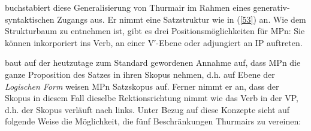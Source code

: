 \citet{Abraham1991a} buchstabiert diese Generalisierung von Thurmair im Rahmen eines generativ-syntaktischen Zugangs aus. Er nimmt eine Satzstruktur wie in (\ref{53}) an. Wie dem Strukturbaum zu entnehmen ist, gibt es drei Positionsmöglichkeiten für MPn: Sie können inkorporiert ins Verb, an einer V′-Ebene oder adjungiert an IP auftreten.

\begin{exe}
	\ex\label{53}   
\end{exe}
\citet{Abraham1991a} baut auf der heutzutage zum Standard gewordenen Annahme auf, dass MPn die ganze Proposition des Satzes in ihren Skopus nehmen, d.h. auf Ebene der \textit{Logischen Form} weisen MPn Satzskopus  auf. Ferner nimmt er an, dass der Skopus in diesem Fall dieselbe Rektionsrichtung  nimmt wie das Verb in der VP, d.h. der Skopus verläuft nach links. Unter Bezug auf diese Konzepte sieht \citet[118]{Abraham1991a} auf folgende Weise die Möglichkeit, die fünf Beschränkungen Thurmairs zu vereinen:

